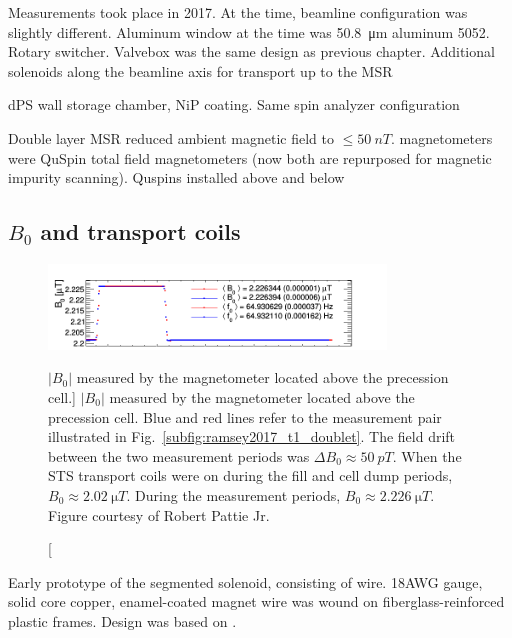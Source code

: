 Measurements took place in 2017. At the time, beamline configuration was slightly different. Aluminum window at the time was \qty{50.8}{\micro\meter} aluminum 5052. Rotary switcher. Valvebox was the same design as previous chapter. Additional solenoids along the beamline axis for transport up to the MSR

dPS wall storage chamber, NiP coating. Same spin analyzer configuration

Double layer MSR reduced ambient magnetic field to $\leq \qty{50}{nT}$. magnetometers were QuSpin total field magnetometers (now both are repurposed for magnetic impurity scanning). Quspins installed above and below


\subsection
{
    \texorpdfstring{$B_0$ and transport coils}
                    {B0 and transport coils}
}


\begin{figure}
    \centering
    \includegraphics[width=0.8\textwidth]{figures/ramsey2017_B0.png}
    \caption
    [$|B_0|$ measured by the magnetometer located above the precession cell.]
    {$|B_0|$ measured by the magnetometer located above the precession cell. Blue and red lines refer to the measurement pair illustrated in Fig.~\ref{subfig:ramsey2017_t1_doublet}. The field drift between the two measurement periods was $\Delta B_0\approx\qty{50}{pT}$. When the STS transport coils were on during the fill and cell dump periods, $B_0\approx\qty{2.02}{\micro T}$.  During the measurement periods, $B_0\approx\qty{2.226}{\micro T}$. Figure courtesy of Robert Pattie Jr.}
    \label{fig:ramsey_2017_b0_map}
\end{figure}

Early prototype of the segmented solenoid, consisting of wire. 18AWG gauge, solid core copper, enamel-coated
magnet wire was wound on fiberglass-reinforced plastic frames. Design was based on \cite{gosling_gapped_solenoid_1974}. 

